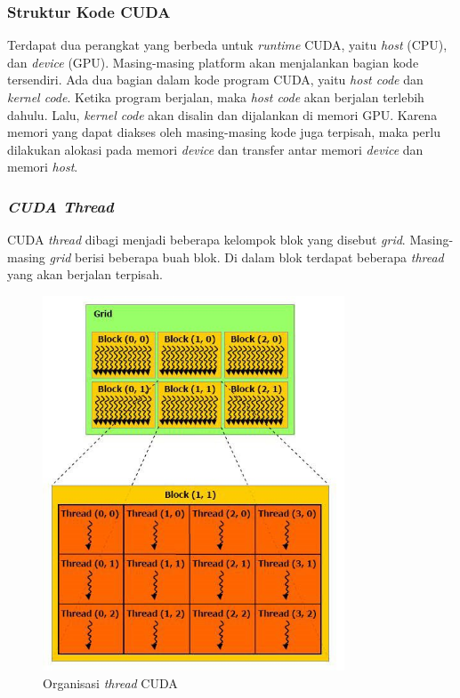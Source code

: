     \subsubsection{Struktur Kode CUDA}

      Terdapat dua perangkat yang berbeda untuk \emph{runtime} CUDA, yaitu \emph{host} (CPU), dan \emph{device} (GPU). Masing-masing platform akan menjalankan bagian kode tersendiri. Ada dua bagian dalam kode program CUDA, yaitu \emph{host code} dan \emph{kernel code}. Ketika program berjalan, maka \emph{host code} akan berjalan terlebih dahulu. Lalu, \emph{kernel code} akan disalin dan dijalankan di memori GPU. Karena memori yang dapat diakses oleh masing-masing kode juga terpisah, maka perlu dilakukan alokasi pada memori \emph{device} dan transfer antar memori \emph{device} dan memori \emph{host}.

    \subsubsection{\emph{CUDA Thread}}

      CUDA \emph{thread} dibagi menjadi beberapa kelompok blok yang disebut \emph{grid}. Masing-masing \emph{grid} berisi beberapa buah blok. Di dalam blok terdapat beberapa \emph{thread} yang akan berjalan terpisah. 

      \begin{figure}[htb]
        \centering
        \includegraphics[width=0.8\textwidth]{resources/cudathread.jpg}
        \caption[Organisasi \emph{thread} CUDA]{Organisasi \emph{thread} CUDA \citep{cuda}}
      \end{figure}

